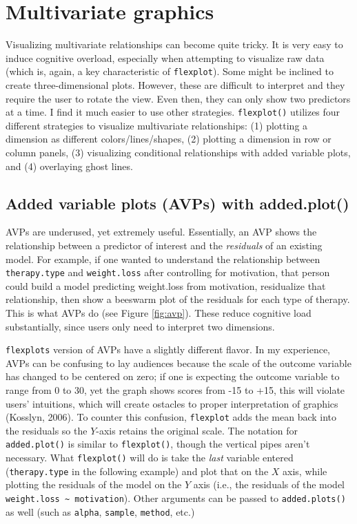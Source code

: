 \documentclass[
  doc]{apa6}
\begin{document}
\hypertarget{multivariate-graphics}{%
\section{Multivariate graphics}\label{multivariate-graphics}}

Visualizing multivariate relationships can become quite tricky. It is very easy to induce cognitive overload, especially when attempting to visualize raw data (which is, again, a key characteristic of \texttt{flexplot}). Some might be inclined to create three-dimensional plots. However, these are difficult to interpret and they require the user to rotate the view. Even then, they can only show two predictors at a time. I find it much easier to use other strategies. \texttt{flexplot()} utilizes four different strategies to visualize multivariate relationships: (1) plotting a dimension as different colors/lines/shapes, (2) plotting a dimension in row or column panels, (3) visualizing conditional relationships with added variable plots, and (4) overlaying ghost lines.

\subsection[Added variable plots (AVPs) with added.plot()]{Added variable plots (AVPs) with added.plot()} \label{sec:added.plot}

AVPs are underused, yet extremely useful. Essentially, an AVP shows the relationship between a predictor of interest and the \emph{residuals} of an existing model. For example, if one wanted to understand the relationship between \texttt{therapy.type} and \texttt{weight.loss} after controlling for motivation, that person could build a model predicting weight.loss from motivation, residualize that relationship, then show a beeswarm plot of the residuals for each type of therapy. This is what AVPs do (see Figure \ref{fig:avp}). These reduce cognitive load substantially, since users only need to interpret two dimensions.

\texttt{flexplot\textquotesingle{}s} version of AVPs have a slightly different flavor. In my experience, AVPs can be confusing to lay audiences because the scale of the outcome variable has changed to be centered on zero; if one is expecting the outcome variable to range from 0 to 30, yet the graph shows scores from -15 to +15, this will violate users' intuitions, which will create ostacles to proper interpretation of graphics (Kosslyn, 2006). To counter this confusion, \texttt{flexplot} adds the mean back into the residuals so the \(Y\)-axis retains the original scale. The notation for \texttt{added.plot()} is similar to \texttt{flexplot()}, though the vertical pipes aren't necessary. What \texttt{flexplot()} will do is take the \emph{last} variable entered (\texttt{therapy.type} in the following example) and plot that on the \(X\) axis, while plotting the residuals of the model on the \(Y\) axis (i.e., the residuals of the model \texttt{weight.loss\ \textasciitilde{}\ motivation}). Other arguments can be passed to \texttt{added.plots()} as well (such as \texttt{alpha}, \texttt{sample}, \texttt{method}, etc.)
\end{document}
